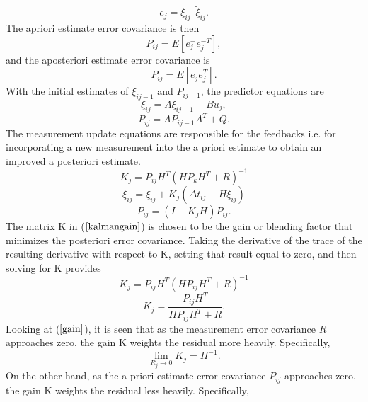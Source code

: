 \documentclass[a4paper,10pt]{report}
\begin{document}
\begin{equation}
e_j =  \xi_{ij} – \tilde \xi_{ij}.
\end{equation}
The apriori estimate error covariance is then
\begin{equation}
P_{ij}^- = E[ e_j^- e_j^{-T} ],
\end{equation}
and the aposteriori estimate error covariance is
\begin{equation}
P_{ij} = E[e_j e_j^T].
\end{equation}
With the initial estimates of $\xi_{ij-1}$ and $P_{ij-1}$, the predictor equations are
\begin{equation}
\xi_{ij} = A\xi_{ij-1} + Bu_j,
\end{equation}
\begin{equation}
P_{ij} = AP_{ij-1}A^T + Q.
\end{equation}
The measurement update equations are responsible for the feedbacks
i.e. for incorporating a new measurement into the a priori estimate
to obtain an improved a posteriori estimate.
\begin{equation}
K_j = P_{ij}H^T(HP_kH^T + R)^{-1} \label{kalmangain}
\end{equation}
\begin{equation}
\xi_{ij} = \xi_{ij} + K_j(\Delta t_{ij} - H\xi_{ij})
\end{equation}
\begin{equation}
P_{ij} = (I-K_jH)P_{ij}.
\end{equation}
The matrix K in ($\ref{kalmangain}$) is
chosen to be the gain or blending factor that minimizes the
posteriori error covariance. Taking the derivative of the trace of
the resulting derivative with respect to K, setting that result equal to zero, and
then solving for K provides
\begin{equation}
K_j = P_{ij}H^{T}(HP_{ij}H^{T} + R)^{-1}
\end{equation}
\begin{equation}
K_j = \dfrac{P_{ij}H^T}{HP_{ij}H^T + R}. \label{gain}
\end{equation}
Looking at ($\ref{gain}$), it is seen that as the measurement error
covariance $R$ approaches zero, the gain K weights the residual more
heavily. Specifically,
\begin{equation}
\mathop {\lim }\limits_{R_j \to 0 } {K_j} = H^{-1}.
\end{equation}
On the other hand, as the a priori estimate error covariance $P_{ij}$
approaches zero, the gain K weights the residual less heavily.
Specifically,
\end{document}
